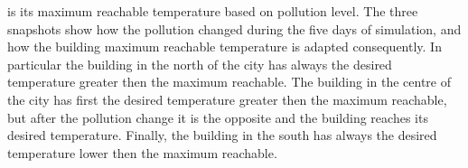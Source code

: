 % 
is its maximum reachable temperature based on pollution level.
The three snapshots show how the pollution changed during the five days of simulation, and how the building maximum reachable temperature is adapted consequently.
In particular the building in the north of the city has always the desired temperature greater then the maximum reachable. 
The building in the centre of the city has first the desired temperature greater then the maximum reachable, but after the pollution change it is the opposite and the building reaches its desired temperature.
Finally, the building in the south has always the desired temperature lower then the maximum reachable.


